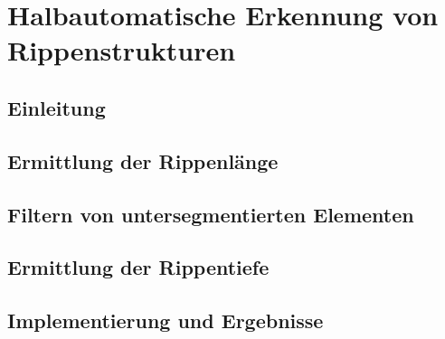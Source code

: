 \chapter{Halbautomatische Erkennung von Rippenstrukturen}
\label{cha:psoDomes}
	
\section{Einleitung}

\section{Ermittlung der Rippenlänge}

\section{Filtern von untersegmentierten Elementen}

\section{Ermittlung der Rippentiefe}

\section{Implementierung und Ergebnisse}